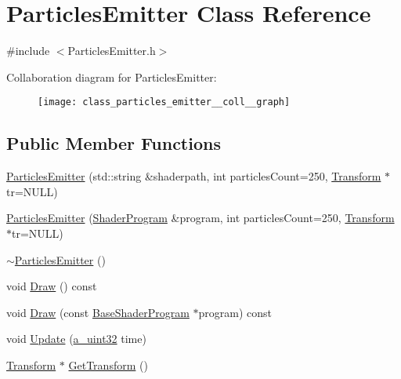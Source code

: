 \hypertarget{class_particles_emitter}{\section{Particles\+Emitter Class Reference}
\label{class_particles_emitter}
}


{\ttfamily \#include $<$Particles\+Emitter.\+h$>$}



Collaboration diagram for Particles\+Emitter\+:\nopagebreak
\begin{figure}[H]
\begin{center}
\leavevmode
\texttt{[image: class\_particles\_emitter\_\_coll\_\_graph]}
\end{center}
\end{figure}
\subsection*{Public Member Functions}
\begin{DoxyCompactItemize}
\item 
\hyperlink{class_particles_emitter_acbf94f018561bb2ff965dca1cf6c1b14}{Particles\+Emitter} (std\+::string \&shaderpath, int particles\+Count=250, \hyperlink{class_agmd_maths_1_1_transform}{Transform} $\ast$tr=N\+U\+L\+L)
\item 
\hyperlink{class_particles_emitter_a7525b09aea03025fb7c1148da750ff68}{Particles\+Emitter} (\hyperlink{class_agmd_1_1_shader_program}{Shader\+Program} \&program, int particles\+Count=250, \hyperlink{class_agmd_maths_1_1_transform}{Transform} $\ast$tr=N\+U\+L\+L)
\item 
\hyperlink{class_particles_emitter_a42bdf88fddda4457168496145cd474b7}{$\sim$\+Particles\+Emitter} ()
\item 
void \hyperlink{class_particles_emitter_ac376a1dcd6bdb9f05021a83c11e3e207}{Draw} () const 
\item 
void \hyperlink{class_particles_emitter_a4779ba9b7cb1d6861ac3538b77a48bc3}{Draw} (const \hyperlink{class_agmd_1_1_base_shader_program}{Base\+Shader\+Program} $\ast$program) const 
\item 
void \hyperlink{class_particles_emitter_a53c719f781fd5778e1982c70b44dc0d5}{Update} (\hyperlink{_common_defines_8h_a964296f9770051b9e4807b1f180dd416}{a\+\_\+uint32} time)
\item 
\hyperlink{class_agmd_maths_1_1_transform}{Transform} $\ast$ \hyperlink{class_particles_emitter_a18a9648cb2a852ccde601908074bc0d8}{Get\+Transform} ()
\end{DoxyCompactItemize}
